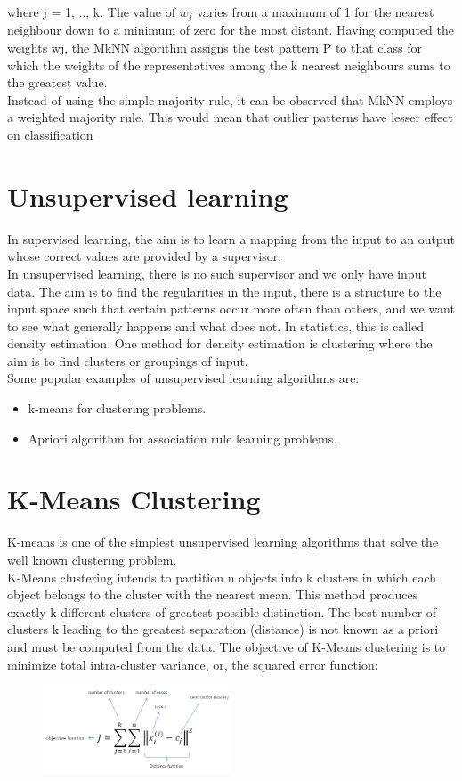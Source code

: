 where j = 1, .., k. The value of $w_{j}$ varies from a maximum of 1 for the nearest
neighbour down to a minimum of zero for the most distant. Having computed the
weights wj, the MkNN algorithm assigns the test pattern P to that class for which the
weights of the representatives among the k nearest neighbours sums to the greatest
value.\\
Instead of using the simple majority rule, it can be observed that MkNN employs
a weighted majority rule. This would mean that outlier patterns have lesser effect on
classification

\section{Unsupervised learning}

In supervised learning, the aim is to learn a mapping from the input to
an output whose correct values are provided by a supervisor.\\
In unsupervised
learning, there is no such supervisor and we only have input data.
The aim is to find the regularities in the input, there is a structure to the
input space such that certain patterns occur more often than others, and we want to see what generally happens and what does not. In statistics, this is called density estimation.
One method for density estimation is clustering where the aim is to
find clusters or groupings of input.\\ 
Some popular examples of unsupervised learning algorithms are:


\begin{itemize}
  \item k-means for clustering problems.
  \item Apriori algorithm for association rule learning problems.
\end{itemize}


\section{ K-Means Clustering }
K-means \cite{kmeans} is one of the simplest unsupervised learning algorithms that solve the well known clustering problem. \\ K-Means clustering intends to partition n objects into k clusters in which each object belongs to the cluster with the nearest mean. This method produces exactly k different clusters of greatest possible distinction. The best number of clusters k leading to the greatest separation (distance) is not known as a priori and must be computed from the data. The objective of K-Means clustering is to minimize total intra-cluster variance, or, the squared error function:
\begin{figure}[H]
\centering
\includegraphics[width=0.5\textwidth]{img/ckmeans.png}
\end{figure}

